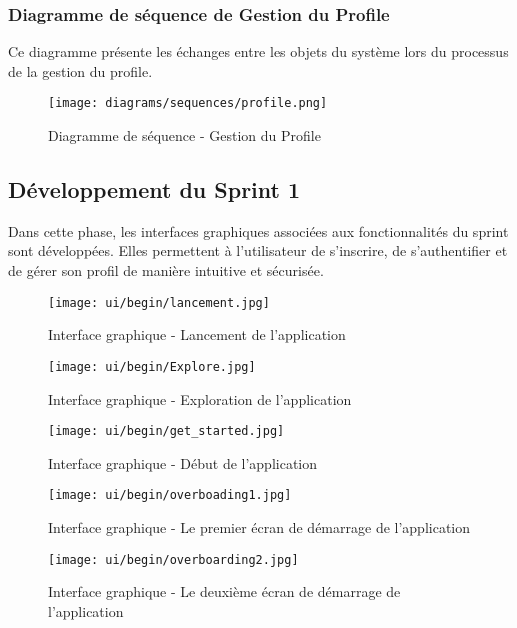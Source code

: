 \subsubsection{Diagramme de séquence de Gestion du Profile}

Ce diagramme présente les échanges entre les objets du système lors du processus de la gestion du profile.

\begin{figure}[H]
    \centering
    \texttt{[image: diagrams/sequences/profile.png]}
    \caption{Diagramme de séquence - Gestion du Profile}
\end{figure}

\subsection{Développement du Sprint 1}

Dans cette phase, les interfaces graphiques associées aux fonctionnalités du sprint sont développées. Elles permettent à l’utilisateur de s’inscrire, de s’authentifier et de gérer son profil de manière intuitive et sécurisée.

\begin{figure}[H]
    \centering
    \texttt{[image: ui/begin/lancement.jpg]}
    \caption{Interface graphique - Lancement de l'application}
\end{figure}

\begin{figure}[H]
    \centering
    \texttt{[image: ui/begin/Explore.jpg]}
    \caption{Interface graphique - Exploration de l'application}
\end{figure}

\begin{figure}[H]
    \centering
    \texttt{[image: ui/begin/get\_started.jpg]}
    \caption{Interface graphique - Début de l'application}
\end{figure}

\begin{figure}[H]
    \centering
    \texttt{[image: ui/begin/overboading1.jpg]}
    \caption{Interface graphique - Le premier écran de démarrage de l'application}
\end{figure}


\begin{figure}[H]
    \centering
    \texttt{[image: ui/begin/overboarding2.jpg]}
    \caption{Interface graphique - Le deuxième écran de démarrage de l'application}
\end{figure}


